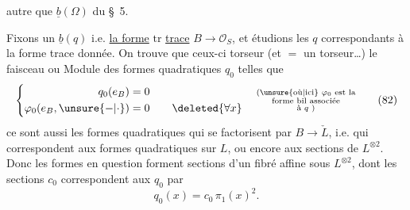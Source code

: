autre que $\underline b(\Omega)$ du \S~5.

Fixons un $\underline b(q)$  i.e.  \uline{la forme} $\mathrm{tr}$
\uline{trace} $B\longrightarrow\mathcal O_S$, et étudions les $q$ correspondants
à la forme trace donnée. On trouve
que ceux-ci   torseur (et $=$ un
torseur\ldots)  le faisceau ou Module des
formes quadratiques $q_0$ telles que
\[
\left\{\begin{aligned}q_0(e_B)&=0\\
\varphi_0(e_B,\unsure{-|\cdot})&=0\qquad\deleted{\forall x}
\end{aligned}\right.\quad
\substack{\text{(\unsure{où|ici} $\varphi_0$ est la}\\\text{forme bil associée}\\\text{à $q$ )}} \tag*{(82)}
\]
ce sont aussi les formes quadratiques
qui se factorisent par $B\longrightarrow\check L$, i.e.
qui correspondent aux formes quadratiques
sur $L$, ou encore aux  sections de
$L^{\otimes2}$. Donc les formes en question
forment  sections d'un fibré affine sous
$L^{\otimes2}$, dont les sections $c_0$ correspondent aux $q_0$ par
\[
q_0(x)=c_0\,\pi_1(x)^2. \tag*{(83)}
\]
